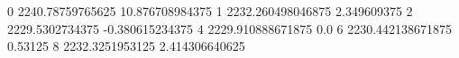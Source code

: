 0 2240.78759765625 10.876708984375
1 2232.260498046875 2.349609375
2 2229.5302734375 -0.380615234375
4 2229.910888671875 0.0
6 2230.442138671875 0.53125
8 2232.3251953125 2.414306640625

